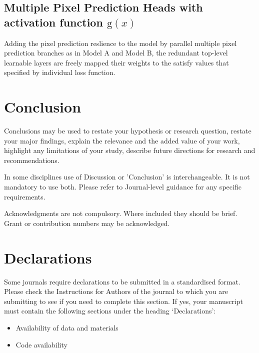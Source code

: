 \documentclass[default,pdflatex,iicol]{sn-jnl}%
\begin{document}
\subsection{Multiple Pixel Prediction Heads with activation function $\mathrm{g}(x)$}
Adding the pixel prediction reslience to the model by parallel multiple pixel prediction branches as in Model A and Model B, the redundant top-level learnable layers are freely mapped their weights to the satisfy values that specified by individual loss function.

\section{Conclusion}
Conclusions may be used to restate your hypothesis or research question, restate your major findings, explain the relevance and the added value of your work, highlight any limitations of your study, describe future directions for research and recommendations. 

In some disciplines use of Discussion or 'Conclusion' is interchangeable. It is not mandatory to use both. Please refer to Journal-level guidance for any specific requirements. 

\backmatter


Acknowledgments are not compulsory. Where included they should be brief. Grant or contribution numbers may be acknowledged.

\section*{Declarations}

Some journals require declarations to be submitted in a standardised format. Please check the Instructions for Authors of the journal to which you are submitting to see if you need to complete this section. If yes, your manuscript must contain the following sections under the heading `Declarations':

\begin{itemize}
\item Availability of data and materials
\item Code availability 
\end{itemize}



\end{document}
